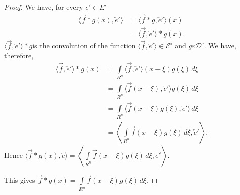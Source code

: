 \begin{proof}
We have, for every $\overleftarrow{e}' \in E'$
\begin{align*}
\langle \overrightarrow{f} \ast g(x), \overleftarrow{e}' \rangle &=
\langle \overrightarrow{f} \ast g, \overleftarrow{e}' \rangle (x)\\
&= \langle \overrightarrow{f}, \overleftarrow{e}' \rangle \ast g (x).
\end{align*}
$\langle\overrightarrow{f}, \overleftarrow{e}' \rangle \ast
g$\pageoriginale is the convolution of the function $\langle
\overrightarrow{f}, \overleftarrow{e}' \rangle \in 
\mathscr{E}^\circ$ and $g \varepsilon \mathscr{D}^\circ$.
We have, therefore,
\begin{align*}
\langle \overrightarrow{f}, \overleftarrow{e}' \rangle \ast g(x) &=
\int\limits_{R^n} \langle \overrightarrow{f}, \overleftarrow{e}'
\rangle (x - \xi) g(\xi)\,d\xi\\
&= \int\limits_{R^n} \langle \overrightarrow{f} (x-\xi),
\overleftarrow{e}' \rangle g (\xi)\,d\xi\\
&= \int\limits_{R^n} \langle \overrightarrow{f} (x-\xi) g (\xi),
\overleftarrow{e}' \rangle\,d\xi\\
&= \left\langle \int\limits_{R^n} \overrightarrow{f} (x-\xi) g (\xi)\,
d\xi, \overleftarrow{e}' \right\rangle.
\end{align*}
Hence $\langle \overrightarrow{f} \ast g (x), \overleftarrow{e}\rangle
= \left\langle \int\limits_{R^n} \overrightarrow{f} (x-\xi) g(\xi)\,
d\xi , \overleftarrow{e}' \right\rangle$.

\noindent This gives $\overrightarrow{f} \ast g (x) =
\int\limits_{R^n}\overrightarrow{f} (x-\xi) g (\xi)\,d\xi$.
\end{proof}


